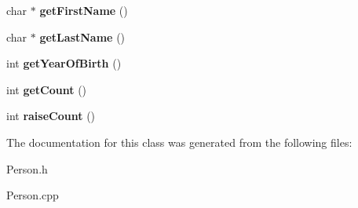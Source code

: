 \begin{DoxyCompactItemize}
char $\ast$ {\bfseries get\+First\+Name} ()
\item 
\mbox{\label{class_person_a253642c10b66ee4d05c8b3669207da0c}} 
char $\ast$ {\bfseries get\+Last\+Name} ()
\item 
\mbox{\label{class_person_adbff6885ccde40a0bbc23c571fac62e5}} 
int {\bfseries get\+Year\+Of\+Birth} ()
\item 
\mbox{\label{class_person_ab383ba032f65b352900e7c182e6d1df9}} 
int {\bfseries get\+Count} ()
\item 
\mbox{\label{class_person_a49846f9c69c2622dc785c72dd999e673}} 
int {\bfseries raise\+Count} ()
\end{DoxyCompactItemize}


The documentation for this class was generated from the following files\+:\begin{DoxyCompactItemize}
\item 
Person.\+h\item 
Person.\+cpp\end{DoxyCompactItemize}
